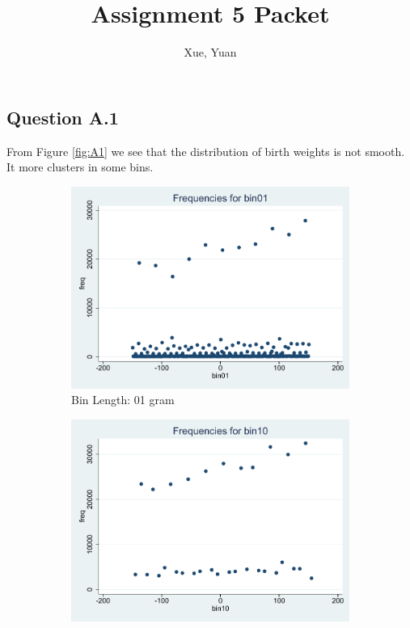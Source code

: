 \documentclass[a4paper,11pt]{article}
\author{Xue, Yuan}
\title{Assignment 5 Packet}
\begin{document}
\maketitle

\subsection*{Question A.1}

From Figure \ref{fig:A1} we see that the distribution of birth weights is not smooth. It more clusters in some bins.

\begin{figure}[h]
\centering
\begin{subfigure}{.33\textwidth}
  \centering
  \includegraphics[width=\linewidth]{graph_bin01.pdf}
  \caption{Bin Length: 01 gram}
  \label{fig:sub1}
\end{subfigure}%
\begin{subfigure}{.33\textwidth}
  \centering
  \includegraphics[width=\linewidth]{graph_bin10.pdf}

\end{subfigure}
\end{figure}
\end{document}
